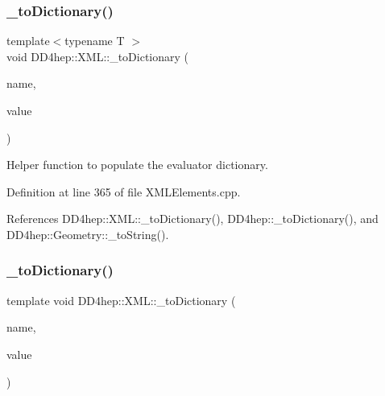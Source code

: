 \subsubsection{\texorpdfstring{\+\_\+to\+Dictionary()}{\_toDictionary()}\hspace{0.1cm}{\footnotesize\ttfamily [2/4]}}
{\footnotesize\ttfamily template$<$typename T $>$ \\
void D\+D4hep\+::\+X\+M\+L\+::\+\_\+to\+Dictionary (\begin{DoxyParamCaption}\item[{const \hyperlink{namespace_d_d4hep_1_1_x_m_l_a09e5d9cc86ed782f6826dfe0778c1815}{Xml\+Char} $\ast$}]{name,  }\item[{\hyperlink{class_t}{T}}]{value }\end{DoxyParamCaption})}



Helper function to populate the evaluator dictionary. 



Definition at line 365 of file X\+M\+L\+Elements.\+cpp.



References D\+D4hep\+::\+X\+M\+L\+::\+\_\+to\+Dictionary(), D\+D4hep\+::\+\_\+to\+Dictionary(), and D\+D4hep\+::\+Geometry\+::\+\_\+to\+String().

\hypertarget{group___d_d4_h_e_p___x_m_l_gac7be63582e2bd7ad2bad66544cb45ede}{}\label{group___d_d4_h_e_p___x_m_l_gac7be63582e2bd7ad2bad66544cb45ede} 
\subsubsection{\texorpdfstring{\+\_\+to\+Dictionary()}{\_toDictionary()}\hspace{0.1cm}{\footnotesize\ttfamily [3/4]}}
{\footnotesize\ttfamily template void D\+D4hep\+::\+X\+M\+L\+::\+\_\+to\+Dictionary (\begin{DoxyParamCaption}\item[{const \hyperlink{namespace_d_d4hep_1_1_x_m_l_a09e5d9cc86ed782f6826dfe0778c1815}{Xml\+Char} $\ast$}]{name,  }\item[{float}]{value }\end{DoxyParamCaption})}



